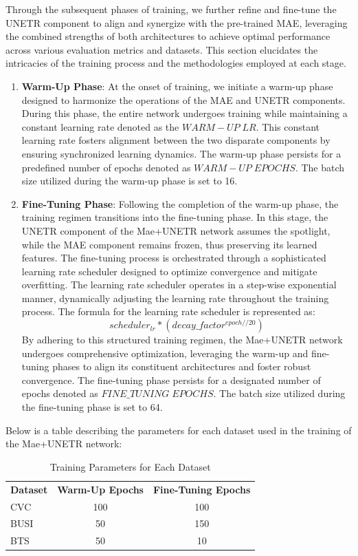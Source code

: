 Through the subsequent phases of training, we further refine and fine-tune the UNETR component to align and synergize with the pre-trained MAE, leveraging the combined strengths of both architectures to achieve optimal performance across various evaluation metrics and datasets. This section elucidates the intricacies of the training process and the methodologies employed at each stage.
\begin{enumerate}
    \item \textbf{Warm-Up Phase}: At the onset of training, we initiate a warm-up phase designed to harmonize the operations of the MAE and UNETR components. During this phase, the entire network undergoes training while maintaining a constant learning rate denoted as the $WARM-UP\;LR$. This constant learning rate fosters alignment between the two disparate components by ensuring synchronized learning dynamics. The warm-up phase persists for a predefined number of epochs denoted as $WARM-UP \;EPOCHS$. The batch size utilized during the warm-up phase is set to 16.
    \item \textbf{Fine-Tuning Phase}: Following the completion of the warm-up phase, the training regimen transitions into the fine-tuning phase. In this stage, the UNETR component of the Mae+UNETR network assumes the spotlight, while the MAE component remains frozen, thus preserving its learned features. The fine-tuning process is orchestrated through a sophisticated learning rate scheduler designed to optimize convergence and mitigate overfitting. The learning rate scheduler operates in a step-wise exponential manner, dynamically adjusting the learning rate throughout the training process. The formula for the learning rate scheduler is represented as:
    \begin{equation*}
        scheduler_{lr} * (decay\_factor^{epoch // 20})
    \end{equation*}
    By adhering to this structured training regimen, the Mae+UNETR network undergoes comprehensive optimization, leveraging the warm-up and fine-tuning phases to align its constituent architectures and foster robust convergence. The fine-tuning phase persists for a designated number of epochs denoted as $FINE\_TUNING\;EPOCHS$. The batch size utilized during the fine-tuning phase is set to 64.
\end{enumerate}
Below is a table describing the parameters for each dataset used in the training of the Mae+UNETR network:

\begin{table}[htbp]
\begin{center}
\begin{tabular}{p{2cm}cc}
\textbf{Dataset} & \textbf{Warm-Up Epochs} & \textbf{Fine-Tuning Epochs} \\
CVC  & 100 & 100 \\
BUSI & 50  & 150 \\
BTS  & 50  & 10 \\
\end{tabular}
\caption{Training Parameters for Each Dataset}
\end{center}
\end{table}

